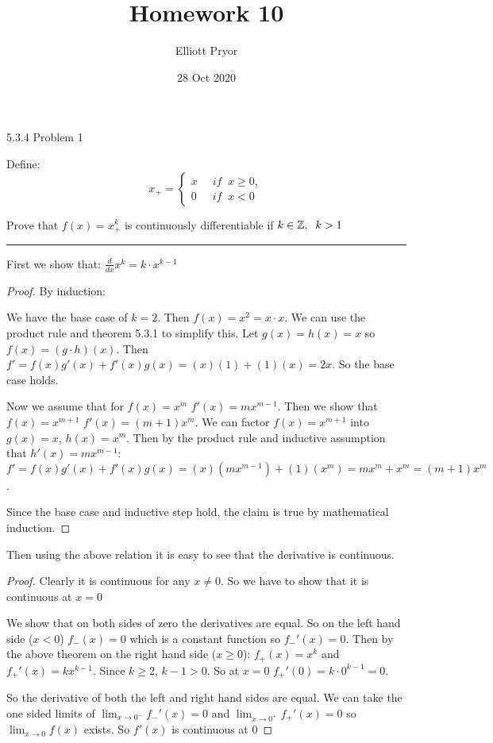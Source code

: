 \documentclass[11pt]{article}
\title{Homework 10}
\author{Elliott Pryor}
\date{28 Oct 2020}
\renewcommand{\sp}{\; \;}
\begin{document}
\maketitle

 5.3.4 Problem 1

Define:
$$x_+ = \begin{cases}
x & \sp if \sp x \geq 0,\\
0 & \sp if \sp x < 0
\end{cases}$$

Prove that $f(x) = x^k_+$ is continuously differentiable if $k \in \integers, \sp k > 1$
\hrule

First we show that: 
$\frac{d}{dx} x^k = k \cdot x^{k-1}$

\begin{proof}
By induction:

We have the base case of $k = 2$. Then $f(x) = x^2 = x \cdot x$. We can use the product rule and theorem 5.3.1 to simplify this.
Let $g(x) = h(x) = x$ so $f(x) = (g \cdot h)(x)$. Then $f' = f(x)g'(x) + f'(x)g(x) = (x)(1) + (1)(x) = 2x$.
So the base case holds. 

Now we assume that for $f(x) = x^m$ $f'(x) = mx^{m-1}$. Then we show that $f(x) = x^{m+1}$ $f'(x) = (m+1)x^m$. 
We can factor $f(x) = x^{m+1}$ into $g(x) = x$, $h(x) = x^m$. 
Then by the product rule and inductive assumption that $h'(x) = mx^{m-1}$: $f' = f(x)g'(x) + f'(x)g(x) = (x)(mx^{m-1}) + (1)(x^m) = mx^m + x^m = (m+1)x^m$.

Since the base case and inductive step hold, the claim is true by mathematical induction.

\end{proof}

Then using the above relation it is easy to see that the derivative is continuous. 

\begin{proof}

Clearly it is continuous for any $x \neq 0$. So we have to show that it is continuous at $x=0$

We show that on both sides of zero the derivatives are equal. 
So on the left hand side ($x < 0$) $f_-(x) = 0$ which is a constant function so $f_-'(x) = 0$. 
Then by the above theorem on the right hand side ($x \geq 0$): $f_+(x) = x^k$ and $f_+'(x) = k x^{k-1}$. 
Since $k \geq 2$, $k - 1 > 0$. So at $x = 0$ $f_+'(0) = k \cdot 0^{k-1} = 0$. 

So the derivative of both the left and right hand sides are equal.  We can take the one sided limits of $\lim_{x \to 0 ^-} f_-'(x) = 0$ and $\lim_{x \to 0 ^+} f_+'(x) = 0$ so $\lim_{x \to 0} f(x)$ exists. So $f'(x)$ is continuous at 0

\end{proof}
\end{document}
